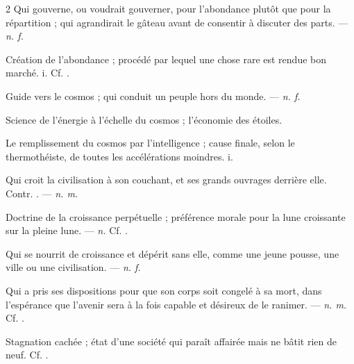 \begin{multicols}{2}
 Qui gouverne, ou voudrait gouverner, pour l'abondance plutôt que pour la répartition ; qui agrandirait le gâteau avant de consentir à discuter des parts. —  \textit{n. f.}

 Création de l'abondance ; procédé par lequel une chose rare est rendue bon marché.   i. Cf. .

 Guide vers le cosmos ; qui conduit un peuple hors du monde. —  \textit{n. f.}

 Science de l'énergie à l'échelle du cosmos ; l'économie des étoiles.

 Le remplissement du cosmos par l'intelligence ; cause finale, selon le thermothéiste, de toutes les accélérations moindres.   i.

 Qui croit la civilisation à son couchant, et ses grands ouvrages derrière elle. Contr. . —  \textit{n. m.}

 Doctrine de la croissance perpétuelle ; préférence morale pour la lune croissante sur la pleine lune. —  \textit{n.} Cf. .

 Qui se nourrit de croissance et dépérit sans elle, comme une jeune pousse, une ville ou une civilisation. —  \textit{n. f.}

 Qui a pris ses dispositions pour que son corps soit congelé à sa mort, dans l'espérance que l'avenir sera à la fois capable et désireux de le ranimer. —  \textit{n. m.} Cf. .

 Stagnation cachée ; état d'une société qui paraît affairée mais ne bâtit rien de neuf. Cf. .


\end{multicols}
